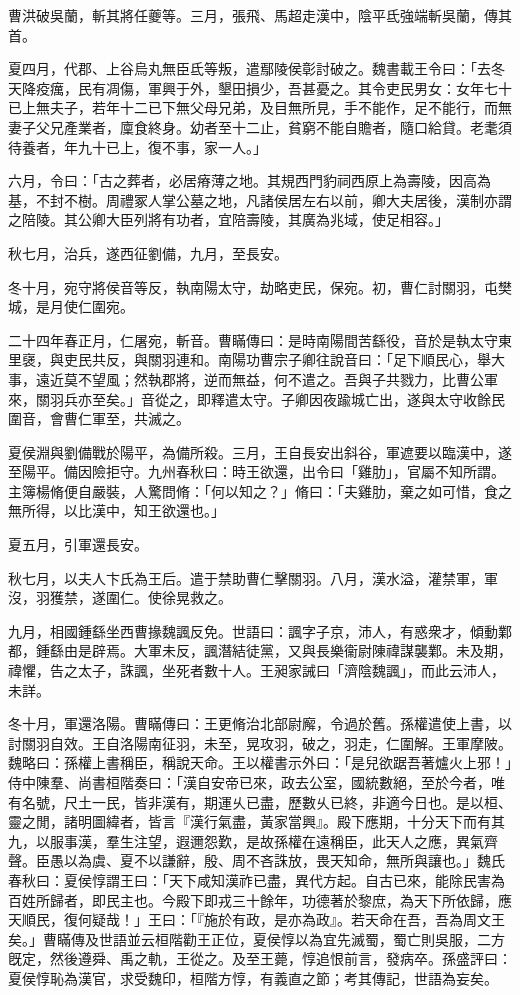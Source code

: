 \begin{pinyinscope}
曹洪破吳蘭，斬其將任夔等。三月，張飛、馬超走漢中，陰平氐強端斬吳蘭，傳其首。

夏四月，代郡、上谷烏丸無臣氐等叛，遣鄢陵侯彰討破之。魏書載王令曰：「去冬天降疫癘，民有凋傷，軍興于外，墾田損少，吾甚憂之。其令吏民男女：女年七十已上無夫子，若年十二已下無父母兄弟，及目無所見，手不能作，足不能行，而無妻子父兄產業者，廩食終身。幼者至十二止，貧窮不能自贍者，隨口給貸。老耄須待養者，年九十已上，復不事，家一人。」

六月，令曰：「古之葬者，必居瘠薄之地。其規西門豹祠西原上為壽陵，因高為基，不封不樹。周禮冢人掌公墓之地，凡諸侯居左右以前，卿大夫居後，漢制亦謂之陪陵。其公卿大臣列將有功者，宜陪壽陵，其廣為兆域，使足相容。」

秋七月，治兵，遂西征劉備，九月，至長安。

冬十月，宛守將侯音等反，執南陽太守，劫略吏民，保宛。初，曹仁討關羽，屯樊城，是月使仁圍宛。

二十四年春正月，仁屠宛，斬音。曹瞞傳曰：是時南陽間苦繇役，音於是執太守東里襃，與吏民共反，與關羽連和。南陽功曹宗子卿往說音曰：「足下順民心，舉大事，遠近莫不望風；然執郡將，逆而無益，何不遣之。吾與子共戮力，比曹公軍來，關羽兵亦至矣。」音從之，即釋遣太守。子卿因夜踰城亡出，遂與太守收餘民圍音，會曹仁軍至，共滅之。

夏侯淵與劉備戰於陽平，為備所殺。三月，王自長安出斜谷，軍遮要以臨漢中，遂至陽平。備因險拒守。九州春秋曰：時王欲還，出令曰「雞肋」，官屬不知所謂。主簿楊脩便自嚴裝，人驚問脩：「何以知之？」脩曰：「夫雞肋，棄之如可惜，食之無所得，以比漢中，知王欲還也。」

夏五月，引軍還長安。

秋七月，以夫人卞氏為王后。遣于禁助曹仁擊關羽。八月，漢水溢，灌禁軍，軍沒，羽獲禁，遂圍仁。使徐晃救之。

九月，相國鍾繇坐西曹掾魏諷反免。世語曰：諷字子京，沛人，有惑衆才，傾動鄴都，鍾繇由是辟焉。大軍未反，諷潛結徒黨，又與長樂衞尉陳禕謀襲鄴。未及期，禕懼，告之太子，誅諷，坐死者數十人。王昶家誡曰「濟陰魏諷」，而此云沛人，未詳。

冬十月，軍還洛陽。曹瞞傳曰：王更脩治北部尉廨，令過於舊。孫權遣使上書，以討關羽自效。王自洛陽南征羽，未至，晃攻羽，破之，羽走，仁圍解。王軍摩陂。魏略曰：孫權上書稱臣，稱說天命。王以權書示外曰：「是兒欲踞吾著爐火上邪！」侍中陳羣、尚書桓階奏曰：「漢自安帝已來，政去公室，國統數絕，至於今者，唯有名號，尺土一民，皆非漢有，期運乆已盡，歷數乆已終，非適今日也。是以桓、靈之閒，諸明圖緯者，皆言『漢行氣盡，黃家當興』。殿下應期，十分天下而有其九，以服事漢，羣生注望，遐邇怨歎，是故孫權在遠稱臣，此天人之應，異氣齊聲。臣愚以為虞、夏不以謙辭，殷、周不吝誅放，畏天知命，無所與讓也。」魏氏春秋曰：夏侯惇謂王曰：「天下咸知漢祚已盡，異代方起。自古已來，能除民害為百姓所歸者，即民主也。今殿下即戎三十餘年，功德著於黎庶，為天下所依歸，應天順民，復何疑哉！」王曰：「『施於有政，是亦為政』。若天命在吾，吾為周文王矣。」曹瞞傳及世語並云桓階勸王正位，夏侯惇以為宜先滅蜀，蜀亡則吳服，二方旣定，然後遵舜、禹之軌，王從之。及至王薨，惇追恨前言，發病卒。孫盛評曰：夏侯惇恥為漢官，求受魏印，桓階方惇，有義直之節；考其傳記，世語為妄矣。


\end{pinyinscope}
